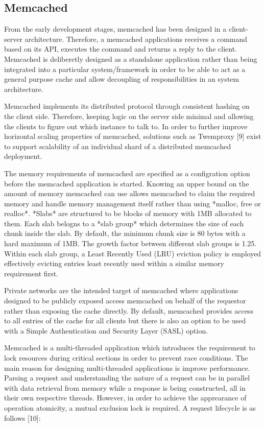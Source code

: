 \subsection{Memcached}
From the early development stages, memcached has been designed in a client-server architecture. Therefore, a memcached applications receives a command based on its API, executes the command and returns a reply to the client. Memcached is deliberetly designed as a standalone application rather than being integrated into a particular system/framework in order to be able to act as a general purpose cache and allow decoupling of responsibilities in an system architecture.

Memcached implements its distributed protocol through consistent hashing on the client side. Therefore, keeping logic on the server side minimal and allowing the clients to figure out which instance to talk to. In order to further improve horizontal scaling properties of memcached, solutions such as Twemproxy [9] exist to support scalability of an individual shard of a distributed memcached deployment.

The memory requirements of memcached are specified as a configration option before the memcached application is started. Knowing an upper bound on the amount of memory memcached can use allows memcached to claim the required memory and handle memory management itself rather than using *malloc, free or realloc*. *Slabs* are structured to be blocks of memory with 1MB allocated to them. Each slab belogns to a *slab group* which determines the size of each chunk inside the slab. By default, the minimum chunk size is 80 bytes with a hard maximum of 1MB. The growth factor between different slab groups is 1.25. Within each slab group, a Least Recently Used (LRU) eviction policy is employed effectively evicting entries least recently used within a similar memory requirement first.

Private networks are the intended target of memcached where applications designed to be publicly exposed access memcached on behalf of the requestor rather than exposing the cache directly. By default, memcached provides access to all entries of the cache for all clients but there is also an option to be used with a Simple Authentication and Security Layer (SASL) option.

Memcached is a multi-threaded application which introduces the requirement to lock resources during critical sections in order to prevent race conditions. The main reason for designing multi-threaded applications is improve performance. Parsing a request and understanding the nature of a request can be in parallel with data retrieval from memory while a response is being constructed, all in their own respective threads. However, in order to achieve the apprearance of operation atomicity, a mutual exclusion lock is required. A request lifecycle is as follows [10]:

